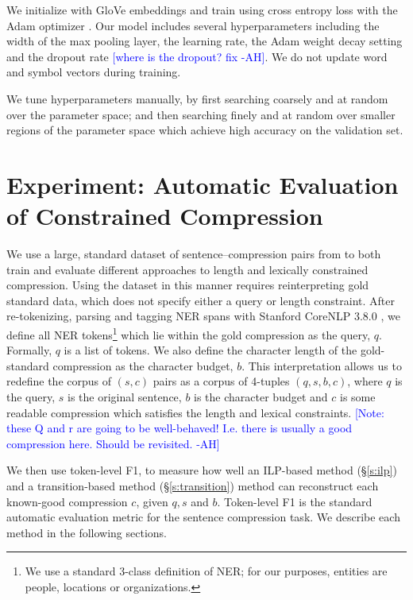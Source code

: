 \documentclass[11pt,a4paper]{article}
\newcommand{\ahcomment}[1]{\textcolor{blue}{[#1 -AH]}}
\begin{document}
We initialize with GloVe embeddings \cite{pennington2014glove} and train using cross entropy loss with the Adam optimizer \cite{Kingma2014AdamAM}. Our model includes several hyperparameters including the width of the max pooling layer, the learning rate, the Adam weight decay setting and the dropout rate \ahcomment{where is the dropout? fix}.  We do not update word and symbol vectors during training. 

We tune hyperparameters manually, by first searching coarsely and at random \cite{Bergstra2012RandomSF} over the parameter space; and then searching finely and at random over smaller regions of the parameter space which achieve high accuracy on the validation set. 

\section{Experiment: Automatic Evaluation of Constrained Compression}

We use a large, standard dataset of sentence--compression pairs from \citet{filippova2013overcoming} to both train and evaluate different approaches to length and lexically constrained compression. Using the dataset in this manner requires reinterpreting gold standard data, which does not specify either a query or length constraint. After re-tokenizing, parsing and tagging NER spans with Stanford CoreNLP 3.8.0 \cite{corenlp}, we define all NER tokens\footnote{We use a standard 3-class definition of NER; for our purposes, entities are people, locations or organizations.} which lie within the gold compression as the query, $q$. Formally, $q$ is a list of tokens. We also define the character length of the gold-standard compression as the character budget, $b$. This interpretation allows us to redefine the corpus of $(s,c)$ pairs as a corpus of 4-tuples $(q,s,b,c)$, where $q$ is the query, $s$ is the original sentence, $b$ is the character budget and $c$ is some readable compression which satisfies the length and lexical constraints.  \ahcomment{Note: these Q and r are going to be well-behaved! I.e. there is usually a good compression here. Should be revisited.}

We then use token-level F1, to measure how well an ILP-based method (\S\ref{s:ilp}) and a transition-based method (\S\ref{s:transition}) method can reconstruct each known-good compression $c$, given $q,s$ and $b$. Token-level F1 is the standard automatic evaluation metric for the sentence compression task. We describe each method in the following sections.
\end{document}
